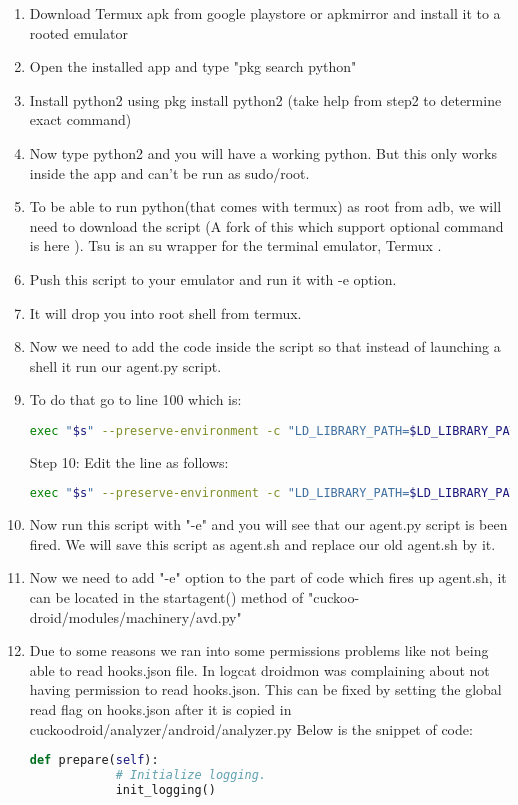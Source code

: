 \documentclass[../main.tex]{subfile}
\begin{document}
		\begin{enumerate}
		\item Download Termux apk from google playstore or apkmirror and install it to a rooted emulator
		\item Open the installed app and type "pkg search python"
		\item Install python2 using pkg install python2 (take help from step2 to determine exact command)
		\item Now type python2 and you will have a working python. But this only works inside the app and can't be run as sudo/root.
		\item To be able to run python(that comes with termux) as root from adb, we will need to download the script \cite{tsu_cswl}  (A fork of this which support optional command is here \cite{tsu_kiney}). Tsu is an su wrapper for the terminal emulator, Termux \cite{termux_website}.
		\item Push this script to your emulator and run it with -e option.
		\item It will drop you into root shell from termux.
		\item Now we need to add the code inside the script so that instead of launching a shell it run our agent.py script.
		\item To do that go to line 100 which is:
		\begin{lstlisting}[language=bash, numbers=none]
		exec "$s" --preserve-environment -c "LD_LIBRARY_PATH=$LD_LIBRARY_PATH $ROOT_SHELL" 
		\end{lstlisting}
		Step 10: Edit the line as follows:
		\begin{lstlisting}[language=bash, numbers=none]
		exec "$s" --preserve-environment -c "LD_LIBRARY_PATH=$LD_LIBRARY_PATH python2 /data/local/agent.py" 
		\end{lstlisting}
		
		\item Now run this script with "-e" and you will see that our agent.py script is been fired. We will save this script as agent.sh and replace our old agent.sh by it.
		\item Now we need to add "-e" option to the part of code which fires up agent.sh, it can be located in the start\textunderscore agent() method of "cuckoo-droid/modules/machinery/avd.py"
		\item Due to some reasons we ran into some permissions problems like not being able to read hooks.json file. In logcat droidmon was complaining about not having permission to read hooks.json. This can be fixed by setting the global read flag on hooks.json after it is copied in cuckoodroid/analyzer/android/analyzer.py Below is the snippet of code:
		\begin{lstlisting}[language=python]
		def prepare(self):
			# Initialize logging.
			init_logging()
			

\end{lstlisting}
\end{enumerate}
\end{document}
